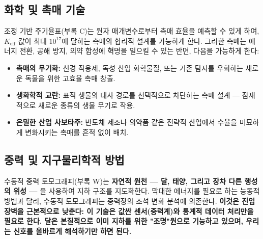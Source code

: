 \documentclass[12pt,a4paper]{article}
\theoremstyle{remark}
\newcommand{\Keff}{K_{\mathrm{eff}}}
\begin{document}
	\subsection{화학 및 촉매 기술}
	\label{subsec:chem}
	
	조정 기반 주기율표(부록 C)는 원자 매개변수로부터 촉매 효율을 예측할 수 있게 하여, \(\Keff\) 값이 최대 \(10^{17}\)에 달하는 촉매의 합리적 설계를 가능하게 한다. 그러한 촉매는 에너지 전환, 공해 방지, 의약 합성에 혁명을 일으킬 수 있는 반면, 다음을 가능하게 한다:
	\begin{itemize}[leftmargin=*]
		\item \textbf{촉매의 무기화:} 신경 작용제, 독성 산업 화학물질, 또는 기존 탐지를 우회하는 새로운 독물을 위한 고효율 촉매 창출.
		\item \textbf{생화학적 교란:} 표적 생물의 대사 경로를 선택적으로 차단하는 촉매 설계 — 잠재적으로 새로운 종류의 생물 무기로 작용.
		\item \textbf{은밀한 산업 사보타주:} 반도체 제조나 의약품 같은 전략적 산업에서 수율을 미묘하게 변화시키는 촉매를 흔적 없이 배치.
	\end{itemize}
	
	\subsection{중력 및 지구물리학적 방법}
	\label{subsec:gravity}
	
	수동적 중력 토모그래피(부록 W)는 \textbf{자연적 원천 — 달, 태양, 그리고 장차 다른 행성의 위성 — }을 사용하여 지하 구조를 지도화한다. 막대한 에너지를 필요로 하는 능동적 방법과 달리, 수동적 토모그래피는 중력장의 조석 변화 분석에 의존한다. \textbf{이것은 진입 장벽을 근본적으로 낮춘다: 이 기술은 값싼 센서(중력계)와 통계적 데이터 처리만을 필요로 한다. 달은 본질적으로 이미 지하를 위한 "조명"원으로 기능하고 있으며, 우리는 신호를 올바르게 해석하기만 하면 된다.}
	
\end{document}
